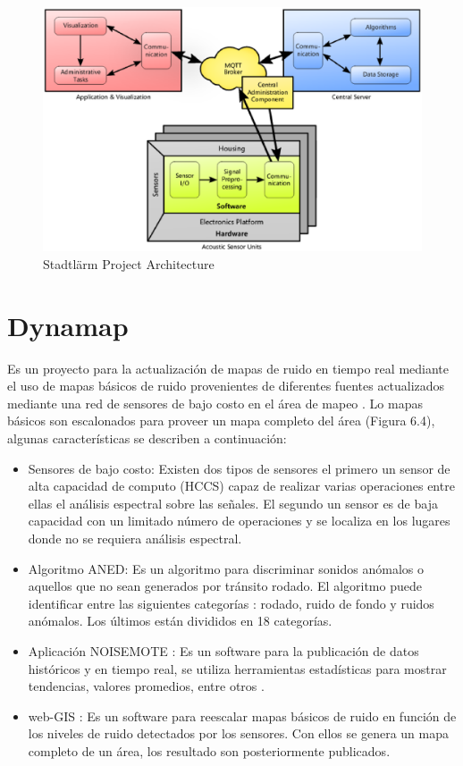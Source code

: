 \begin{figure}[H]
\caption{Stadtlärm Project Architecture \cite{Abeer2019} }
\centering
\includegraphics[width=\linewidth]{bibliografia/Imagenes/stadtlarm_arch.eps}
\end{figure}

\section{Dynamap}

Es un proyecto para la actualización de mapas de ruido en tiempo real mediante el uso de mapas básicos de ruido provenientes de diferentes fuentes actualizados mediante una red de sensores de bajo costo en el área de mapeo \cite{Bellucci2018}. Lo mapas básicos son escalonados para proveer un mapa completo del área (Figura 6.4), algunas características se describen a continuación:

\begin{itemize}
    \item Sensores de bajo costo: Existen dos tipos de sensores el primero un sensor de alta capacidad de computo (HCCS) capaz de realizar varias operaciones entre ellas el análisis espectral sobre las señales. El segundo un sensor es de baja capacidad con un limitado número de operaciones y se localiza en los lugares donde no se requiera análisis espectral\cite{Bellucci2018}.
    \item Algoritmo ANED: Es un algoritmo para discriminar sonidos anómalos o aquellos que no sean generados por tránsito rodado. El algoritmo puede identificar entre las siguientes categorías : rodado, ruido de fondo y ruidos anómalos. Los últimos están divididos en 18 categorías\cite{Bellucci2018}.
    \item Aplicación NOISEMOTE : Es un software para la publicación de datos históricos y en tiempo real, se utiliza herramientas estadísticas para mostrar tendencias, valores promedios, entre otros \cite{Bellucci2018}.
    \item web-GIS : Es un software para reescalar mapas básicos de ruido en función de los niveles de ruido detectados por los sensores. Con ellos se genera un mapa completo de un área, los resultado son posteriormente publicados\cite{Bellucci2018}.
\end{itemize}


